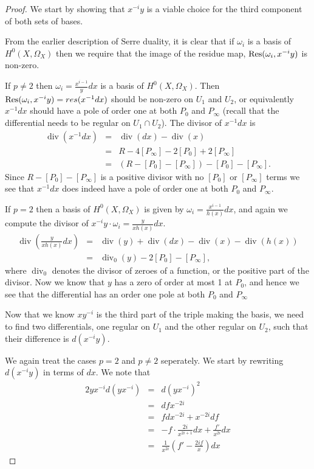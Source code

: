 \documentclass[draft, 11pt]{article} %
\theoremstyle{plain}
\theoremstyle{remark}
\DeclareMathOperator{\di}{div}
\begin{document}
\begin{proof}

We start by showing that $x^{-i}y$ is a viable choice for the third component of both sets of bases.

From the earlier description of Serre duality, it is clear that if $\omega_i$ is a basis of $H^0(X, \Omega_X)$ then we require that the image of the residue map, ${\rm Res}(\omega_i, x^{-i}y)$ is non-zero.

If $p \neq 2$ then $\omega_i = \frac{x^{i-1}}{y}dx$ is a basis of $H^0(X, \Omega_X)$. 
Then ${\rm Res}(\omega_i, x^{-i}y) = res(x^{-1}dx)$ should be non-zero on $U_1$ and $U_2$, or equivalently $x^{-1}dx$ should have a pole of order one at both $P_0$ and $P_\infty$ (recall that the differential needs to be regular on $U_1 \cap U_2$).
The divisor of $x^{-1}dx$ is
\begin{eqnarray}
\di (x^{-1}dx) & = & \di(dx) - \di (x) \\
& = & R - 4[P_\infty] - 2[P_0] + 2[P_\infty] \\
& = & (R-[P_0]-[P_\infty]) - [P_0] - [P_\infty].
\end{eqnarray}
Since $R -[P_0]-[P_\infty]$ is a positive divisor with no $[P_0]$ or $[P_\infty]$ terms we see that $x^{-1}dx$ does indeed have a pole of order one at both $P_0$ and $P_\infty$.

If $p=2$ then a basis of $H^0(X,\Omega_X)$ is given by $\omega_i = \frac{x^{i-1}}{h(x)}dx$, and again we compute the divisor of $x^{-i}y\cdot \omega_i = \frac{y}{xh(x)}dx$.
\begin{eqnarray}
\di\left( \frac{y}{xh(x)}dx \right) & = & \di(y) + \di(dx) - \di(x) - \di(h(x)) \\
& = & \di_0(y) -2[P_0] -[P_\infty],
\end{eqnarray}
where $\di_0$ denotes the divisor of zeroes of a function, or the positive part of the divisor.
Now we know that $y$ has a zero of order at most 1 at $P_0$, and hence we see that the differential has an order one pole at both $P_0$ and $P_\infty$ 

Now that we know $xy^{-i}$ is the third part of the triple making the basis, we need to find two differentials, one regular on $U_1$ and the other regular on $U_2$, such that their difference is $d(x^{-i}y)$.

We again treat the cases $p=2$ and $p\neq 2$ seperately.
We start by rewriting $d(x^{-i}y)$ in terms of $dx$.
We note that
\begin{eqnarray*}
2yx^{-i}d(yx^{-i}) & = & d(yx^{-i})^2 \\
& = & dfx^{-2i} \\
& = & fdx^{-2i} + x^{-2i}df \\
& = & -f\cdot\frac{2i}{x^{2i+1}}dx + \frac{f'}{x^{2i}}dx \\
& = & \frac{1}{x^{2i}}\left( f' - \frac{2if}{x}\right) dx 
\end{eqnarray*}


\end{proof}
\end{document}
